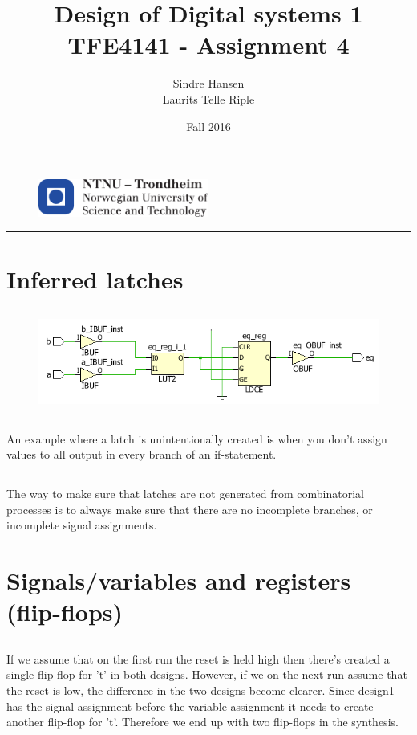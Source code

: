 \documentclass{article}
\title{Design of Digital systems 1 TFE4141 - Assignment 4}
\author{Sindre Hansen \\ Laurits Telle Riple}
\date{Fall 2016}
\begin{document}
\begin{figure}
  \centering
  \includegraphics[width=0.5\textwidth]{images/logontnu_eng}
\end{figure}
\maketitle
\rule{\linewidth}{0.5mm}

\section{Inferred latches}
\subsection{}
\begin{figure}[hbp]
  \centering
  \includegraphics[width=\textwidth]{images/task1-1}
\end{figure}

\subsection{}
An example where a latch is unintentionally created is when you don't
assign values to all output in every branch of an if-statement.

\subsection{}
The way to make sure that latches are not generated from combinatorial
processes is to always make sure that there are no incomplete
branches, or incomplete signal assignments.

\section{Signals/variables and registers (flip-flops)}
\subsection{}
If we assume that on the first run the reset is held high then there's
created a single flip-flop for 't' in both designs. However, if we on
the next run assume that the reset is low, the difference in the two
designs become clearer. Since design1 has the signal assignment before
the variable assignment it needs to create another flip-flop for
't'. Therefore we end up with two flip-flops in the synthesis.
\end{document}
